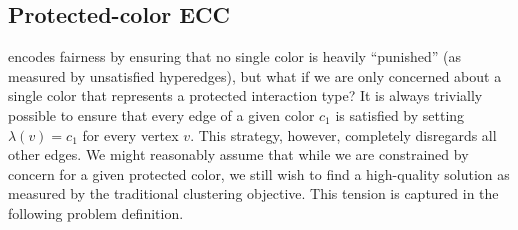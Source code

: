 \subsection{Protected-color ECC}\label{sec:protected-class}

\cfminECC{} encodes fairness by ensuring that no single color is heavily ``punished'' (as measured by unsatisfied hyperedges), but what if we are only concerned about a single color that represents a protected interaction type?
It is always trivially possible to ensure that every edge of a given color $c_1$ is satisfied by setting $\lambda(v) = c_1$ for every vertex $v$.
This strategy, however, completely disregards all other edges.
We might reasonably assume that while we are constrained by concern for a given protected color, we still wish to
find a high-quality solution as measured by the traditional clustering objective.
This tension is captured in the following problem definition.


